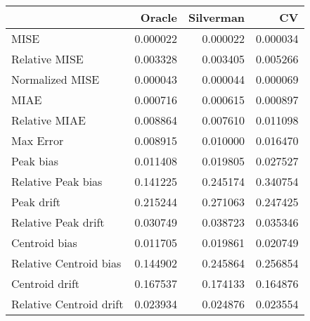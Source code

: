\begin{tabular}{lrrr}
  \hline
 & Oracle & Silverman & CV \\ 
  \hline
MISE & 0.000022 & 0.000022 & 0.000034 \\ 
  Relative MISE & 0.003328 & 0.003405 & 0.005266 \\ 
  Normalized MISE & 0.000043 & 0.000044 & 0.000069 \\ 
  MIAE & 0.000716 & 0.000615 & 0.000897 \\ 
  Relative MIAE & 0.008864 & 0.007610 & 0.011098 \\ 
  Max Error & 0.008915 & 0.010000 & 0.016470 \\ 
  Peak bias & 0.011408 & 0.019805 & 0.027527 \\ 
  Relative Peak bias & 0.141225 & 0.245174 & 0.340754 \\ 
  Peak drift & 0.215244 & 0.271063 & 0.247425 \\ 
  Relative Peak drift & 0.030749 & 0.038723 & 0.035346 \\ 
  Centroid bias & 0.011705 & 0.019861 & 0.020749 \\ 
  Relative Centroid bias & 0.144902 & 0.245864 & 0.256854 \\ 
  Centroid drift & 0.167537 & 0.174133 & 0.164876 \\ 
  Relative Centroid drift & 0.023934 & 0.024876 & 0.023554 \\ 
   \hline
\end{tabular}
